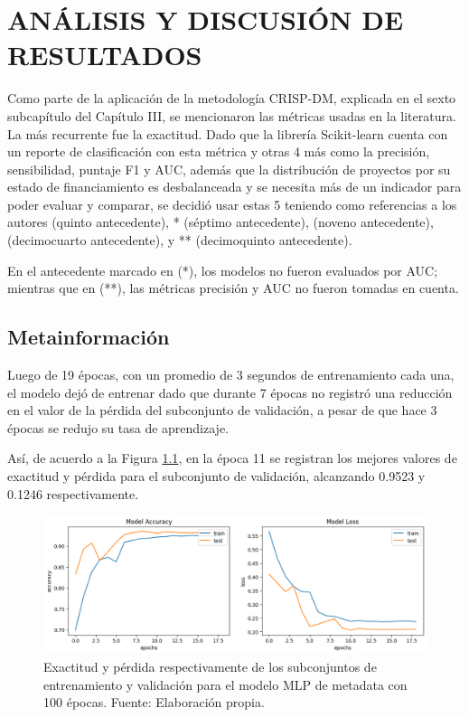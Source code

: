 \chapter{ANÁLISIS Y DISCUSIÓN DE RESULTADOS}
Como parte de la aplicación de la metodología CRISP-DM, explicada en el sexto subcapítulo del Capítulo III, se mencionaron las métricas usadas en la literatura. La más recurrente fue la exactitud. Dado que la librería Scikit-learn cuenta con un reporte de clasificación con esta métrica y otras 4 más como la precisión, sensibilidad, puntaje F1 y AUC, además que la distribución de proyectos por su estado de financiamiento es desbalanceada y se necesita más de un indicador para poder evaluar y comparar, se decidió usar estas 5 teniendo como referencias a los autores \citeauthor{pr_beckwith2016predcrowd} (quinto antecedente), \citeauthor{pr_yuan2016textanalytics}* (séptimo antecedente), \citeauthor{pr_kaur2017socmedcrowd} (noveno antecedente), \citeauthor{pr_cheng2019deeplearning} (decimocuarto antecedente), y \citeauthor{pr_chen2019keywords_crowdfunding}** (decimoquinto antecedente).

En el antecedente marcado en (*), los modelos no fueron evaluados por AUC; mientras que en (**), las métricas precisión y AUC no fueron tomadas en cuenta.

\section{Metainformación}
Luego de 19 épocas, con un promedio de 3 segundos de entrenamiento cada una, el modelo dejó de entrenar dado que durante 7 épocas no registró una reducción en el valor de la pérdida del subconjunto de validación, a pesar de que hace 3 épocas se redujo su tasa de aprendizaje.

Así, de acuerdo a la Figura \ref{5:fig1}, en la época 11 se registran los mejores valores de exactitud y pérdida para el subconjunto de validación, alcanzando 0.9523 y 0.1246 respectivamente.

\begin{figure}[!ht]
	\begin{center}
		\includegraphics[width=1\textwidth]{5/figures/metadata_model_acc_loss.png}
		\caption{Exactitud y pérdida respectivamente de los subconjuntos de entrenamiento y validación para el modelo MLP de metadata con 100 épocas. Fuente: Elaboración propia.}
		\label{5:fig1}
	\end{center}
\end{figure}

